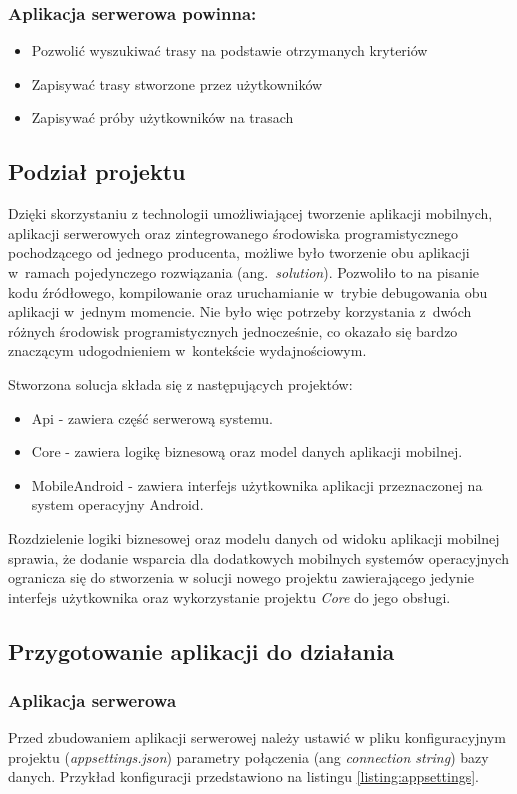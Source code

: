 \subsubsection{Aplikacja serwerowa powinna:}
\begin{itemize}
\item{Pozwolić wyszukiwać trasy na podstawie otrzymanych kryteriów}
\item{Zapisywać trasy stworzone przez użytkowników}
\item{Zapisywać próby użytkowników na trasach}
\end{itemize}

\subsection{Podział projektu}
Dzięki skorzystaniu z technologii umożliwiającej tworzenie aplikacji mobilnych, aplikacji serwerowych oraz zintegrowanego środowiska programistycznego pochodzącego od jednego producenta, możliwe było tworzenie obu aplikacji w~ramach pojedynczego rozwiązania (ang.~\textit{solution}). Pozwoliło to na pisanie kodu źródłowego, kompilowanie oraz uruchamianie w~trybie debugowania obu aplikacji w~jednym momencie. Nie było więc potrzeby korzystania z~dwóch różnych środowisk programistycznych jednocześnie, co okazało się bardzo znaczącym udogodnieniem w~kontekście wydajnościowym.

Stworzona solucja składa się z następujących projektów:
\begin{itemize}
\item{Api} - zawiera część serwerową systemu.
\item{Core} - zawiera logikę biznesową oraz model danych aplikacji mobilnej.
\item{MobileAndroid} - zawiera interfejs użytkownika aplikacji przeznaczonej na system operacyjny Android.
\end{itemize}
Rozdzielenie logiki biznesowej oraz modelu danych od widoku aplikacji mobilnej sprawia, że dodanie wsparcia dla dodatkowych mobilnych systemów operacyjnych ogranicza się do stworzenia w solucji nowego projektu zawierającego jedynie interfejs użytkownika oraz wykorzystanie projektu \textit{Core} do jego obsługi.

\subsection{Przygotowanie aplikacji do działania}
\subsubsection{Aplikacja serwerowa}
Przed zbudowaniem aplikacji serwerowej należy ustawić w pliku konfiguracyjnym projektu (\textit{appsettings.json}) parametry połączenia (ang \textit{connection string}) bazy danych. Przykład konfiguracji przedstawiono na listingu \ref{listing:appsettings}.

